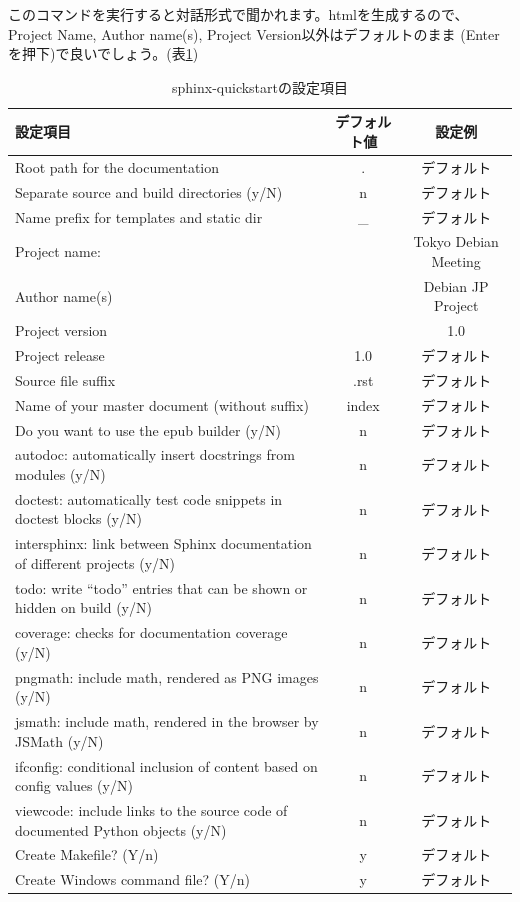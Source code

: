 \documentclass[mingoth,a4paper]{jsarticle}
\begin{document}
このコマンドを実行すると対話形式で聞かれます。htmlを生成するので、
Project Name, Author name(s), Project Version以外はデフォルトのまま
(Enterを押下)で良いでしょう。(表\ref{tab:sphinx-quickstart})

\begin{table}[h]
{\scriptsize
 \caption{sphinx-quickstartの設定項目}\label{tab:sphinx-quickstart}
  \begin{tabular}{|l|c|c|}
    \hline
    設定項目 & デフォルト値 & 設定例 \\
    \hline
    Root path for the documentation & . & デフォルト \\
    Separate source and build directories (y/N) & n & デフォルト \\
    Name prefix for templates and static dir & \_ & デフォルト \\
    Project name: & & Tokyo Debian Meeting \\
    Author name(s) & & Debian JP Project \\
    Project version & & 1.0 \\
    Project release & 1.0 & デフォルト \\
    Source file suffix & .rst & デフォルト \\
    Name of your master document (without suffix) & index & デフォルト \\
    Do you want to use the epub builder (y/N) & n & デフォルト \\
    autodoc: automatically insert docstrings from modules (y/N) & n & デフォルト\\
    doctest: automatically test code snippets in doctest blocks (y/N) & n & デフォルト \\
    intersphinx: link between Sphinx documentation of different projects (y/N) & n & デフォルト \\
    todo: write ``todo'' entries that can be shown or hidden on build (y/N) & n & デフォルト \\
    coverage: checks for documentation coverage (y/N) & n & デフォルト\\
    pngmath: include math, rendered as PNG images (y/N) & n & デフォルト \\
    jsmath: include math, rendered in the browser by JSMath (y/N) & n & デフォルト \\
    ifconfig: conditional inclusion of content based on config values (y/N) & n & デフォルト\\
    viewcode: include links to the source code of documented Python objects (y/N) & n & デフォルト \\
    Create Makefile? (Y/n) & y & デフォルト \\
    Create Windows command file? (Y/n) & y & デフォルト \\
    \hline
  \end{tabular}
}
\end{table}
\end{document}
